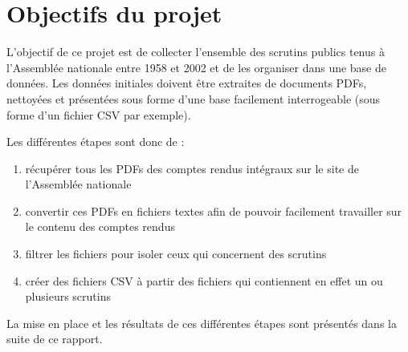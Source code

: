 \section{Objectifs du projet}

L'objectif de ce projet est de collecter l'ensemble des scrutins publics tenus à l'Assemblée nationale entre 1958 et 2002 et de les organiser dans une base de données.
Les données initiales doivent être extraites de documents PDFs, nettoyées et présentées sous forme d'une base facilement interrogeable (sous forme d'un fichier CSV par exemple).

Les différentes étapes sont donc de :
\begin{enumerate}
\item récupérer tous les PDFs des comptes rendus intégraux sur le site de l'Assemblée nationale
\item convertir ces PDFs en fichiers textes afin de pouvoir facilement travailler sur le contenu des comptes rendus
\item filtrer les fichiers pour isoler ceux qui concernent des scrutins
\item créer des fichiers CSV à partir des fichiers qui contiennent en effet un ou plusieurs scrutins
\end{enumerate}

La mise en place et les résultats de ces différentes étapes sont présentés dans la suite de ce rapport.
